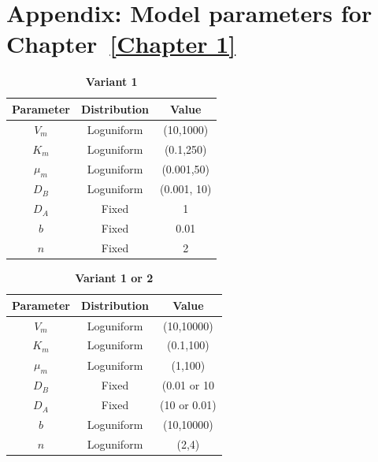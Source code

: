 \appendix
\chapter{Appendix: Model parameters for Chapter~\ref{Chapter 1}}

\begin{table}[H]
    \centering
    \caption{\textbf{Variant 1}}
    \label{tab:variant_1}
    \renewcommand{\arraystretch}{1.3} %
    \begin{tabular}{|c|c|c|}
        \hline
        \textbf{Parameter} & \textbf{Distribution} & \textbf{Value}\\
        \hline
        $V_{m}$ & Loguniform & (10,1000)\\
        \hline
        $K_{m}$ & Loguniform & (0.1,250)\\
        \hline
        $\mu_{m}$ & Loguniform & (0.001,50)\\
        \hline
        $D_{B}$ & Loguniform & (0.001, 10)\\
        \hline
        $D_{A}$ & Fixed & 1\\
        \hline
        $b$ & Fixed & 0.01\\
        \hline
        $n$ & Fixed & 2\\
        \hline
    \end{tabular}
\end{table}


\begin{table}[H]
    \centering
    \caption{\textbf{Variant 1 or 2}}
    \label{tab:variant_2}
    \renewcommand{\arraystretch}{1.3} %
    \begin{tabular}{|c|c|c|}
        \hline
        \textbf{Parameter} & \textbf{Distribution} & \textbf{Value}\\
        \hline
        $V_{m}$ & Loguniform & (10,10000)\\
        \hline
        $K_{m}$ & Loguniform & (0.1,100)\\
        \hline
        $\mu_{m}$ & Loguniform & (1,100)\\
        \hline
        $D_{B}$ & Fixed & (0.01 or 10\\
        \hline
        $D_{A}$ & Fixed & (10 or 0.01)\\
        \hline
        $b$ & Loguniform & (10,10000)\\
        \hline
        $n$ & Loguniform & (2,4)\\
        \hline
    \end{tabular}
\end{table}


